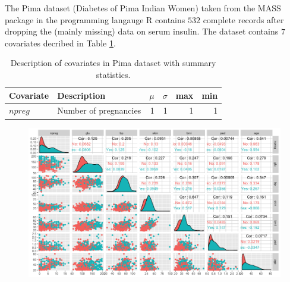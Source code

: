 \documentclass[11pt,letterpaper]{article}
\begin{document}
The Pima dataset (Diabetes of Pima Indian Women) taken from the MASS package \citep{pima_d}
in the programming langauge R \citep{Rprog} contains $ 532$ complete records after dropping the (mainly missing) data on serum insulin.  The dataset contains $7$ covariates decribed in Table \ref{covDes}.

\begin{table}[!h]
\label{covDes}
\caption{Description of covariates in Pima dataset with summary statistics.}
\centering
\begin{tabular}{|llrrrr|}
\hline
Covariate & Description & $\mu$ & $\sigma$ & max & min \\ 
\hline
 $npreg$ & Number of pregnancies &  1 & 1 & 1 & 1\\
\hline
\end{tabular}
\end{table}


\begin{figure}
\label{pairsPlot}
\includegraphics[scale=0.50]{plotgg}
\end{figure}
\newpage


 
\end{document}
